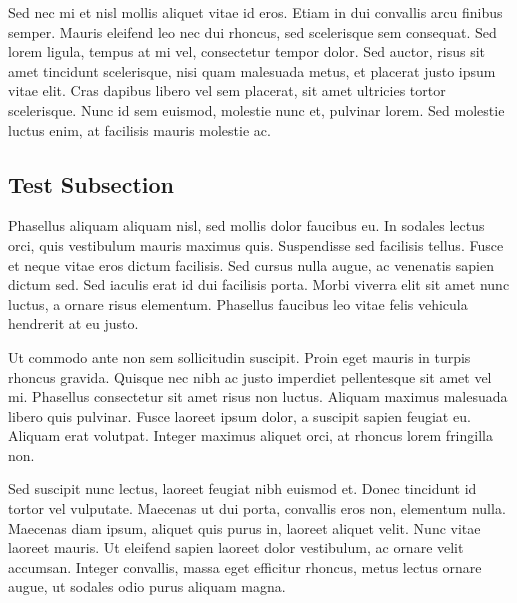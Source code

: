 Sed nec mi et nisl mollis aliquet vitae id eros. 
Etiam in dui convallis arcu finibus semper. 
Mauris eleifend leo nec dui rhoncus, sed scelerisque sem consequat. 
Sed lorem ligula, tempus at mi vel, consectetur tempor dolor. 
Sed auctor, risus sit amet tincidunt scelerisque, nisi quam malesuada metus, et placerat justo ipsum vitae elit. 
Cras dapibus libero vel sem placerat, sit amet ultricies tortor scelerisque. 
Nunc id sem euismod, molestie nunc et, pulvinar lorem. 
Sed molestie luctus enim, at facilisis mauris molestie ac. 

\subsection{Test Subsection}\label{ssec:test}
Phasellus aliquam aliquam nisl, sed mollis dolor faucibus eu. 
In sodales lectus orci, quis vestibulum mauris maximus quis. 
Suspendisse sed facilisis tellus. 
Fusce et neque vitae eros dictum facilisis. 
Sed cursus nulla augue, ac venenatis sapien dictum sed. 
Sed iaculis erat id dui facilisis porta. 
Morbi viverra elit sit amet nunc luctus, a ornare risus elementum. 
Phasellus faucibus leo vitae felis vehicula hendrerit at eu justo.

Ut commodo ante non sem sollicitudin suscipit. 
Proin eget mauris in turpis rhoncus gravida. 
Quisque nec nibh ac justo imperdiet pellentesque sit amet vel mi. 
Phasellus consectetur sit amet risus non luctus. 
Aliquam maximus malesuada libero quis pulvinar. 
Fusce laoreet ipsum dolor, a suscipit sapien feugiat eu. 
Aliquam erat volutpat. 
Integer maximus aliquet orci, at rhoncus lorem fringilla non. 

Sed suscipit nunc lectus, laoreet feugiat nibh euismod et. 
Donec tincidunt id tortor vel vulputate. 
Maecenas ut dui porta, convallis eros non, elementum nulla. 
Maecenas diam ipsum, aliquet quis purus in, laoreet aliquet velit. 
Nunc vitae laoreet mauris. 
Ut eleifend sapien laoreet dolor vestibulum, ac ornare velit accumsan. 
Integer convallis, massa eget efficitur rhoncus, metus lectus ornare augue, ut sodales odio purus aliquam magna.

